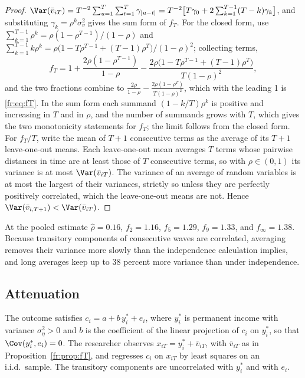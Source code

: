 \begin{proof}
$\Var(\bar v_{iT}) = T^{-2}\sum_{u=1}^{T}\sum_{t=1}^{T}\gamma_{|u-t|}
= T^{-2}\big[T\gamma_0 + 2\sum_{k=1}^{T-1}(T-k)\gamma_k\big]$, and
substituting $\gamma_k = \rho^k\sigma^2_v$ gives the sum form of $f_T$.
For the closed form, use $\sum_{k=1}^{T-1}\rho^k = \rho(1-\rho^{T-1})/(1-\rho)$
and $\sum_{k=1}^{T-1}k\rho^k = \rho\big(1 - T\rho^{T-1} + (T-1)\rho^{T}\big)/(1-\rho)^2$;
collecting terms,
\[
f_T = 1 + \frac{2\rho(1-\rho^{T-1})}{1-\rho} - \frac{2\rho\big(1 - T\rho^{T-1} + (T-1)\rho^{T}\big)}{T(1-\rho)^2},
\]
and the two fractions combine to $\frac{2\rho}{1-\rho} - \frac{2\rho(1-\rho^T)}{T(1-\rho)^2}$,
which with the leading 1 is \eqref{fr:eq:fT}. In the sum form each summand
$(1-k/T)\rho^k$ is positive and increasing in $T$ and in $\rho$, and the
number of summands grows with $T$, which gives the two monotonicity
statements for $f_T$; the limit follows from the closed form. For
$f_T/T$, write the mean of $T+1$ consecutive terms as the average of its
$T+1$ leave-one-out means. Each leave-one-out mean averages $T$ terms
whose pairwise distances in time are at least those of $T$ consecutive
terms, so with $\rho \in (0,1)$ its variance is at most
$\Var(\bar v_{iT})$. The variance of an average of random variables is at
most the largest of their variances, strictly so unless they are
perfectly positively correlated, which the leave-one-out means are not. Hence
$\Var(\bar v_{i,T+1}) < \Var(\bar v_{iT})$.
\end{proof}

At the pooled estimate $\hat\rho = 0.16$, $f_2 = 1.16$, $f_5 = 1.29$,
$f_9 = 1.33$, and $f_\infty = 1.38$. Because transitory components of consecutive waves are correlated, averaging removes their variance more slowly than the independence calculation implies, and long averages keep up to 38 percent more variance than under independence.

\subsection{Attenuation}

\begin{assumption}
\label{fr:ass:cev}
The outcome satisfies $c_i = a + b\,y^*_i + e_i$, where $y^*_i$ is
permanent income with variance $\sigma^2_\eta > 0$ and $b$ is the coefficient
of the linear projection of $c_i$ on $y^*_i$, so that
$\Cov(y^*_i, e_i) = 0$. The researcher observes
$x_{iT} = y^*_i + \bar v_{iT}$, with $\bar v_{iT}$ as in
Proposition~\ref{fr:prop:fT}, and regresses $c_i$ on $x_{iT}$ by least
squares on an i.i.d.\ sample. The transitory components are uncorrelated
with $y^*_i$ and with $e_i$.
\end{assumption}

